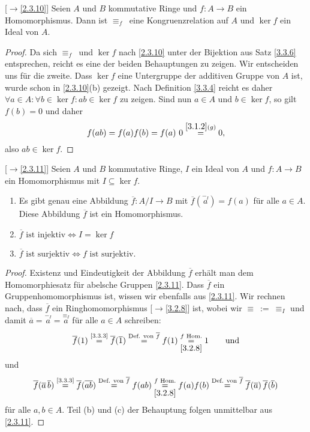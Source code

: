 \documentclass[../../main.tex]{subfiles}
\begin{document}
\begin{defprop}\label{3.3.15}[$\to$\ref{2.3.10}]
Seien $A$ und $B$ kommutative Ringe und $f\colon A\to B$ ein Homomorphismus. Dann ist $\equiv_f~$ eine Kongruenzrelation auf $A$ und
$\ker f$ ein Ideal von $A$.
\end{defprop}

\begin{proof}
Da sich $\equiv_f~$ und $\ker f$ nach \ref{2.3.10} unter der Bijektion aus Satz \ref{3.3.6} entsprechen, reicht es eine der beiden Behauptungen zu zeigen. Wir entscheiden uns für die
zweite. Dass $\ker f$ eine Untergruppe der additiven Gruppe von $A$ ist, wurde schon in \ref{2.3.10}(b) gezeigt. Nach Definition \ref{3.3.4} reicht es daher
$\forall a\in A:\forall b\in\ker f:ab\in\ker f$ zu zeigen. Sind nun $a\in A$ und $b\in\ker f$, so gilt $f(b)=0$ und daher $$f(ab)=f(a)f(b)=f(a)~0\overset{\ref{3.1.2}(g)}=0,$$
also $ab\in\ker f$.
\end{proof}

\begin{sat}\label{3.3.16}{\rm[$\to$\ref{2.3.11}]}
Seien $A$ und $B$ kommutative Ringe, $I$ ein Ideal von $A$ und $f\colon A\to B$ ein Homomorphismus
mit $I\subseteq\ker f$.
\begin{enumerate}[\rm(a)]
\item
Es gibt genau eine Abbildung $\overline f\colon A/I\to B$ mit
$\overline f(\overset{-_I}a)=f(a)$ für alle $a\in A$. Diese Abbildung $\overline f$ ist ein Homomorphismus.
\item
$\text{$\overline f$ ist injektiv}\iff I=\ker f$
\item
$\text{$\overline f$ ist surjektiv}\iff\text{$f$ ist surjektiv.}$
\end{enumerate}
\end{sat}
\begin{proof}
Existenz und Eindeutigkeit der Abbildung $\overline f$ erhält man dem Homomorphiesatz für abelsche Gruppen \ref{2.3.11}.
Dass $\overline f$ ein Gruppenhomomorphismus ist, wissen wir ebenfalls aus \ref{2.3.11}. Wir rechnen nach, dass $\overline f$ ein Ringhomomorphismus [$\to$\ref{3.2.8}] ist, wobei
wir $\equiv~:=~\equiv_I$ und damit $\overline a=\overset{-_I}a=\overset{\equiv_I}a$ für alle $a\in A$ schreiben:
$$\overline f(1)\overset{\text{\ref{3.3.3}}}=\overline f(\overline 1)\overset{\text{Def. von $\overline f$}}=f(1)\overset{\text{$f$ Hom.}}{\underset{\ref{3.2.8}}=}1\qquad\text{und}$$
und
$$\overline f(\overline a\,\overline b)\overset{\text{\ref{3.3.3}}}=\overline f(\overline{ab})\overset{\text{Def. von $\overline f$}}=f(ab)\overset{\text{$f$ Hom.}}{\underset{\ref{3.2.8}}=}f(a)f(b)
\overset{\text{Def. von $\overline f$}}=\overline f(\overline a)\,\overline f(\overline b)
$$
für alle $a,b\in A$.
Teil (b) und (c) der Behauptung folgen unmittelbar aus \ref{2.3.11}.
\end{proof}
\end{document}
